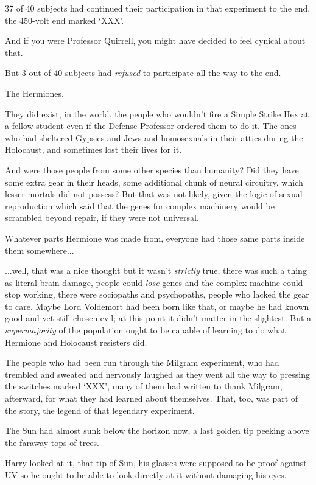 37 of 40 subjects had continued their participation in that experiment to the end, the 450-volt end marked `XXX'.

And if you were Professor Quirrell, you might have decided to feel cynical about that.

But 3 out of 40 subjects had \emph{refused} to participate all the way to the end.

The Hermiones.

They did exist, in the world, the people who wouldn't fire a Simple Strike Hex at a fellow student even if the Defense Professor ordered them to do it. The ones who had sheltered Gypsies and Jews and homosexuals in their attics during the Holocaust, and sometimes lost their lives for it.

And were those people from some other species than humanity? Did they have some extra gear in their heads, some additional chunk of neural circuitry, which lesser mortals did not possess? But that was not likely, given the logic of sexual reproduction which said that the genes for complex machinery would be scrambled beyond repair, if they were not universal.

Whatever parts Hermione was made from, everyone had those same parts inside them somewhere...

...well, that was a nice thought but it wasn't \emph{strictly} true, there was such a thing as literal brain damage, people could \emph{lose} genes and the complex machine could stop working, there were sociopaths and psychopaths, people who lacked the gear to care. Maybe Lord Voldemort had been born like that, or maybe he had known good and yet still chosen evil; at this point it didn't matter in the slightest. But a \emph{supermajority} of the population ought to be capable of learning to do what Hermione and Holocaust resisters did.

The people who had been run through the Milgram experiment, who had trembled and sweated and nervously laughed as they went all the way to pressing the switches marked `XXX', many of them had written to thank Milgram, afterward, for what they had learned about themselves. That, too, was part of the story, the legend of that legendary experiment.

The Sun had almost sunk below the horizon now, a last golden tip peeking above the faraway tops of trees.

Harry looked at it, that tip of Sun, his glasses were supposed to be proof against UV so he ought to be able to look directly at it without damaging his eyes.

